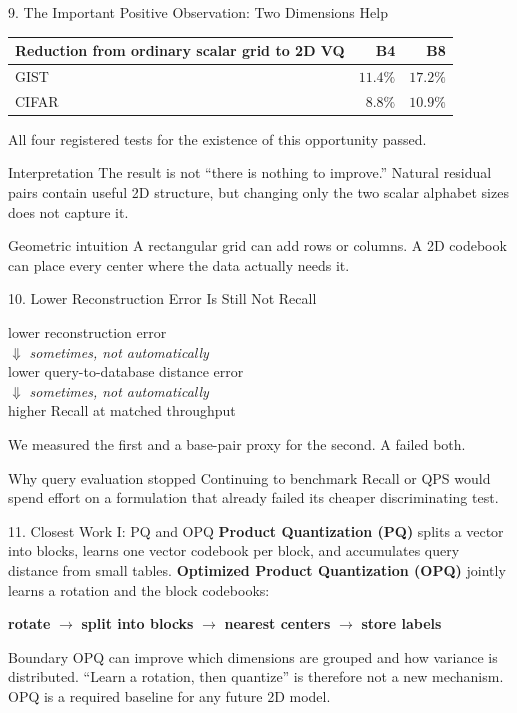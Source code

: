 \documentclass[aspectratio=169]{beamer}
\newcommand{\paper}[1]{\textbf{#1}}
\newcommand{\plain}[1]{\textcolor{blue!65!black}{\textbf{#1}}}
\begin{document}
\begin{frame}{9. The Important Positive Observation: Two Dimensions Help}
\begin{center}
\begin{tabular}{lrr}
\toprule
Reduction from ordinary scalar grid to 2D VQ & B4 & B8\\
\midrule
GIST  & $11.4\%$ & $17.2\%$\\
CIFAR & $8.8\%$  & $10.9\%$\\
\bottomrule
\end{tabular}
\end{center}
All four registered tests for the existence of this opportunity passed.
\begin{block}{Interpretation}
The result is not ``there is nothing to improve.'' Natural residual pairs contain useful 2D structure, but changing only the two scalar alphabet sizes does not capture it.
\end{block}
\begin{alertblock}{Geometric intuition}
A rectangular grid can add rows or columns. A 2D codebook can place every center where the data actually needs it.
\end{alertblock}
\end{frame}

\begin{frame}{10. Lower Reconstruction Error Is Still Not Recall}
\begin{center}
\large lower reconstruction error\\[1mm]
$\Downarrow$ \textit{sometimes, not automatically}\\[1mm]
lower query-to-database distance error\\[1mm]
$\Downarrow$ \textit{sometimes, not automatically}\\[1mm]
higher Recall at matched throughput
\end{center}
\normalsize
We measured the first and a base-pair proxy for the second. A failed both.
\begin{alertblock}{Why query evaluation stopped}
Continuing to benchmark Recall or QPS would spend effort on a formulation that already failed its cheaper discriminating test.
\end{alertblock}
\end{frame}

\begin{frame}{11. Closest Work I: PQ and OPQ}
\paper{Product Quantization (PQ)} splits a vector into blocks, learns one vector codebook per block, and accumulates query distance from small tables.
\medskip
\paper{Optimized Product Quantization (OPQ)} jointly learns a rotation and the block codebooks:
\begin{center}
\plain{rotate} $\rightarrow$ \plain{split into blocks} $\rightarrow$ \plain{nearest centers} $\rightarrow$ \plain{store labels}
\end{center}
\begin{block}{Boundary}
OPQ can improve which dimensions are grouped and how variance is distributed. ``Learn a rotation, then quantize'' is therefore not a new mechanism. OPQ is a required baseline for any future 2D model.
\end{block}
\end{frame}
\end{document}

